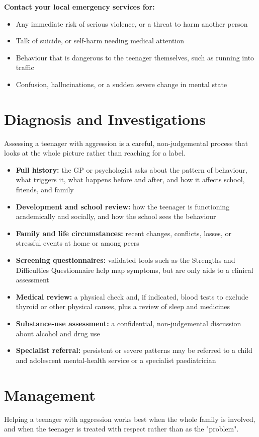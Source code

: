 \textbf{Contact your local emergency services for:}
\begin{itemize}
    \item Any immediate risk of serious violence, or a threat to harm another person
    \item Talk of suicide, or self-harm needing medical attention
    \item Behaviour that is dangerous to the teenager themselves, such as running into traffic
    \item Confusion, hallucinations, or a sudden severe change in mental state
\end{itemize}

\section*{Diagnosis and Investigations}
Assessing a teenager with aggression is a careful, non-judgemental process that looks at the whole picture rather than reaching for a label.

\begin{itemize}
    \item \textbf{Full history:} the GP or psychologist asks about the pattern of behaviour, what triggers it, what happens before and after, and how it affects school, friends, and family
    \item \textbf{Development and school review:} how the teenager is functioning academically and socially, and how the school sees the behaviour
    \item \textbf{Family and life circumstances:} recent changes, conflicts, losses, or stressful events at home or among peers
    \item \textbf{Screening questionnaires:} validated tools such as the Strengths and Difficulties Questionnaire help map symptoms, but are only aids to a clinical assessment
    \item \textbf{Medical review:} a physical check and, if indicated, blood tests to exclude thyroid or other physical causes, plus a review of sleep and medicines
    \item \textbf{Substance-use assessment:} a confidential, non-judgemental discussion about alcohol and drug use
    \item \textbf{Specialist referral:} persistent or severe patterns may be referred to a child and adolescent mental-health service or a specialist paediatrician
\end{itemize}

\section*{Management}
Helping a teenager with aggression works best when the whole family is involved, and when the teenager is treated with respect rather than as the "problem".

